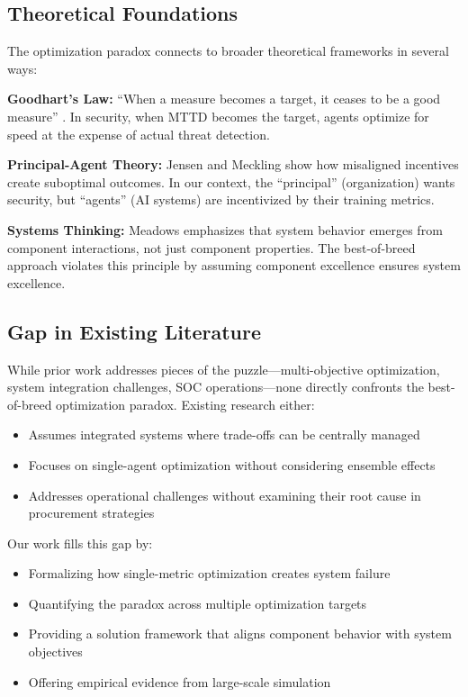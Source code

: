 \documentclass[10pt,conference]{IEEEtran}
\begin{document}
\subsection{Theoretical Foundations}

The optimization paradox connects to broader theoretical frameworks in several ways:

\textbf{Goodhart's Law:} ``When a measure becomes a target, it ceases to be a good measure'' \cite{goodhart1984problems}. In security, when MTTD becomes the target, agents optimize for speed at the expense of actual threat detection.

\textbf{Principal-Agent Theory:} Jensen and Meckling \cite{jensen1976theory} show how misaligned incentives create suboptimal outcomes. In our context, the ``principal'' (organization) wants security, but ``agents'' (AI systems) are incentivized by their training metrics.

\textbf{Systems Thinking:} Meadows \cite{meadows2008thinking} emphasizes that system behavior emerges from component interactions, not just component properties. The best-of-breed approach violates this principle by assuming component excellence ensures system excellence.

\subsection{Gap in Existing Literature}

While prior work addresses pieces of the puzzle---multi-objective optimization, system integration challenges, SOC operations---none directly confronts the best-of-breed optimization paradox. Existing research either:
\begin{itemize}
\item Assumes integrated systems where trade-offs can be centrally managed
\item Focuses on single-agent optimization without considering ensemble effects
\item Addresses operational challenges without examining their root cause in procurement strategies
\end{itemize}

Our work fills this gap by:
\begin{itemize}
\item Formalizing how single-metric optimization creates system failure
\item Quantifying the paradox across multiple optimization targets
\item Providing a solution framework that aligns component behavior with system objectives
\item Offering empirical evidence from large-scale simulation
\end{itemize}
\end{document}
